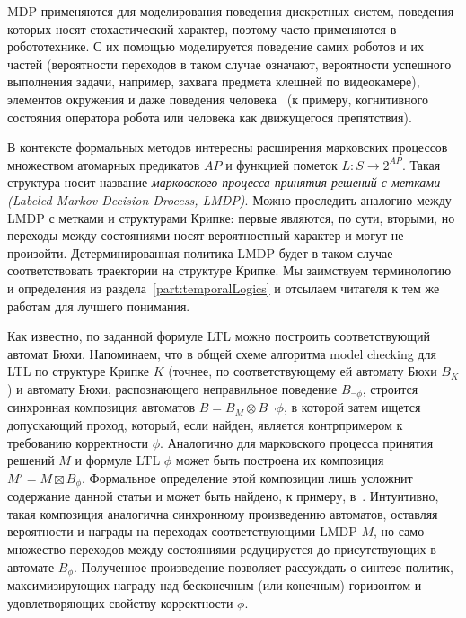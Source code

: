 \documentclass[conference]{IEEEtran}
\begin{document}
MDP применяются для моделирования поведения дискретных систем, поведения которых 
носят стохастический характер, поэтому часто применяются в робототехнике. 
С их помощью моделируется поведение самих роботов и их частей (вероятности 
переходов в таком случае означают, вероятности успешного выполнения задачи, 
например, захвата предмета клешней по видеокамере), элементов окружения и даже 
поведения человека~\cite{pentland1999modeling, rothkopf2013modular, mcghan2015human} 
(к примеру, когнитивного состояния оператора робота или человека как движущегося 
препятствия).

В контексте формальных методов интересны расширения марковских процессов 
множеством атомарных предикатов $AP$ и функцией пометок $L: S\rightarrow{}2^{AP}$. 
Такая структура носит название \textit{марковского процесса принятия решений с 
метками (Labeled Markov Decision Drocess, LMDP)}. Можно проследить аналогию между 
LMDP с метками и структурами Крипке: первые являются, по сути, вторыми, но 
переходы между состояниями носят вероятностный характер и могут не произойти. 
Детерминированная политика LMDP будет в таком случае соответствовать траектории 
на структуре Крипке. Мы заимствуем терминологию и определения из раздела~\ref{part:temporalLogics}
и отсылаем читателя к тем же работам для лучшего понимания.

Как известно, по заданной формуле LTL можно построить соответствующий автомат 
Бюхи. Напоминаем, что в общей схеме алгоритма model checking для LTL по структуре 
Крипке $K$ (точнее, по соответствующему ей автомату Бюхи $B_K$) и автомату Бюхи, 
распознающего неправильное поведение $B_{\neg\phi}$, строится синхронная 
композиция автоматов $B = B_M\otimes{}B{\neg\phi}$, в которой затем ищется 
допускающий проход, который, если найден, является контрпримером к требованию 
корректности $\phi$. Аналогично для марковского процесса принятия решений $M$ и 
формуле LTL $\phi$ может быть построена их композиция $M' = M \boxtimes B_\phi$. 
Формальное определение этой композиции лишь усложнит содержание данной статьи 
и может быть найдено, к примеру, в~\cite{fu2014pareto}. Интуитивно, такая 
композиция аналогична синхронному произведению автоматов, оставляя вероятности 
и награды на переходах соответствующими LMDP $M$, но само множество переходов 
между состояниями редуцируется до присутствующих в автомате $B_\phi$. 
Полученное произведение позволяет рассуждать о синтезе политик, максимизирующих 
награду над бесконечным (или конечным) горизонтом и удовлетворяющих свойству 
корректности $\phi$.
\end{document}
